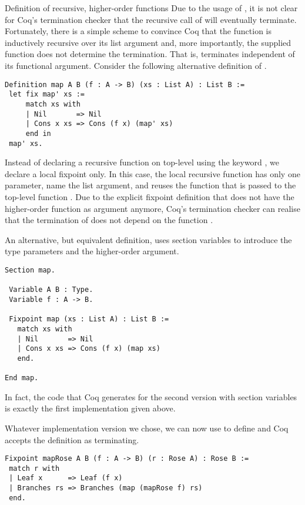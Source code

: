 \begin{excursus}{Definition of recursive, higher-order functions}
Due to the usage of , it is not clear for Coq's termination
checker that the recursive call of  will eventually
terminate.
Fortunately, there is a simple scheme to convince Coq that the
function  is inductively recursive over its list argument
and, more importantly, the supplied function does not determine the
termination.
That is,  terminates independent of its functional argument.
Consider the following alternative definition of .

\begin{verbatim}
Definition map A B (f : A -> B) (xs : List A) : List B :=
 let fix map' xs :=
     match xs with
     | Nil       => Nil
     | Cons x xs => Cons (f x) (map' xs)
     end in
 map' xs.
\end{verbatim}

Instead of declaring a recursive function on top-level using the
keyword , we declare a local fixpoint only.
In this case, the local recursive function  has only one
parameter, name the list argument, and reuses the function 
that is passed to the top-level function .
Due to the explicit fixpoint definition that does not have the
higher-order function as argument anymore, Coq's termination checker
can realise that the termination of  does not depend on the
function .

An alternative, but equivalent definition, uses section variables to
introduce the type parameters and the higher-order argument.

\begin{verbatim}
Section map.

 Variable A B : Type.
 Variable f : A -> B.

 Fixpoint map (xs : List A) : List B :=
   match xs with
   | Nil       => Nil
   | Cons x xs => Cons (f x) (map xs)
   end.

End map.
\end{verbatim}

In fact, the code that Coq generates for the second version with
section variables is exactly the first implementation given above.

Whatever implementation version we chose, we can now use  to
define  and Coq accepts the definition as terminating.

\begin{verbatim}
Fixpoint mapRose A B (f : A -> B) (r : Rose A) : Rose B :=
 match r with
 | Leaf x      => Leaf (f x)
 | Branches rs => Branches (map (mapRose f) rs)
 end.
\end{verbatim}
\end{excursus}

